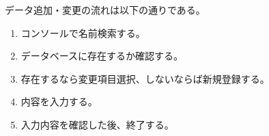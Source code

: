 データ追加・変更の流れは以下の通りである。
\begin{enumerate}
    \item コンソールで名前検索する。
    \item データベースに存在するか確認する。
    \item 存在するなら変更項目選択、しないならば新規登録する。
    \item 内容を入力する。
    \item 入力内容を確認した後、終了する。
\end{enumerate}